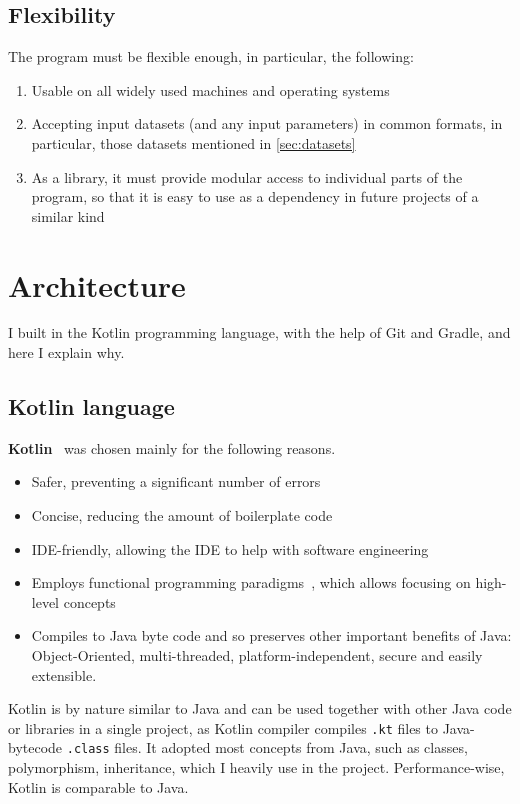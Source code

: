 \subsection{Flexibility}

The program must be flexible enough, in particular, the following:
\begin{enumerate}[topsep=5pt,itemsep=0pt]
    \item Usable on all widely used machines and operating systems
    \item Accepting input datasets (and any input parameters) in common formats, in particular, those datasets mentioned in \cref{sec:datasets}
    \item As a library, it must provide modular access to individual parts of the program, so that it is easy to use \graffs as a dependency in future projects of a similar kind
\end{enumerate}


\section{Architecture}

I built \graffs in the Kotlin programming language, with the help of Git and Gradle, and here I explain why.

\subsection{Kotlin language}

\textbf{Kotlin}~\cite{JemerovKotlinAction2017} was chosen mainly for the following reasons.
\begin{itemize}[topsep=5pt]
    \item Safer, preventing a significant number of errors
    \item Concise, reducing the amount of boilerplate code
    \item IDE-friendly, allowing the IDE to help with software engineering
    \item Employs functional programming paradigms~\cite{Bonev}, which allows focusing on high-level concepts
    \item Compiles to Java byte code and so preserves other important benefits of Java: Object-Oriented, multi-threaded, platform-independent, secure and easily extensible.
\end{itemize}

Kotlin is by nature similar to Java and can be used together with other Java code or libraries in a single project, as Kotlin compiler compiles \texttt{.kt} files to Java-bytecode \texttt{.class} files.
It adopted most concepts from Java, such as classes, polymorphism, inheritance, which I heavily use in the project.
Performance-wise, Kotlin is comparable to Java.

